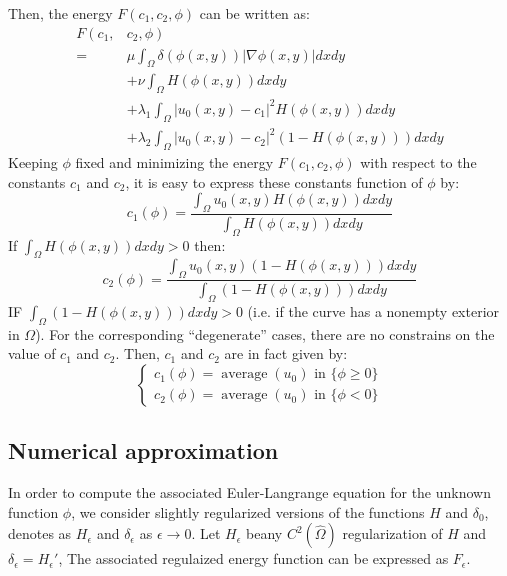 \documentclass[journal]{IEEEtran}
\begin{document}
Then, the energy $F(c_1,c_2,\phi)$ can be written as:
\begin{equation}
  \begin{aligned}
  F\left(c_{1},\right.&\left.c_{2}, \phi\right) \\
  =& \mu \int_{\Omega} \delta(\phi(x, y))|\nabla \phi(x, y)| d x d y \\
  &+\nu \int_{\Omega} H(\phi(x, y)) d x d y \\
  &+\lambda_{1} \int_{\Omega}\left|u_{0}(x, y)-c_{1}\right|^{2} H(\phi(x, y)) d x d y \\
  &+\lambda_{2} \int_{\Omega}\left|u_{0}(x, y)-c_{2}\right|^{2}(1-H(\phi(x, y))) d x d y
  \end{aligned}
\end{equation}
Keeping $\phi$ fixed and minimizing the energy $F(c_1,c_2,\phi)$ with respect to the constants $c_1$ and $c_2$, it is easy to express these constants function of $\phi$ by:
\begin{equation}
  c_{1}(\phi)=\frac{\int_{\Omega} u_{0}(x, y) H(\phi(x, y)) d x d y}{\int_{\Omega} H(\phi(x, y)) d x d y}
\end{equation} 
If $\int_\Omega H(\phi(x,y))d x d y >0$ then:
\begin{equation}
  c_{2}(\phi)=\frac{\int_{\Omega} u_{0}(x, y)(1-H(\phi(x, y))) d x d y}{\int_{\Omega}(1-H(\phi(x, y))) d x d y}
\end{equation}
IF $\int_\Omega(1-H(\phi(x,y)))d x d y>0$ (i.e. if the curve has a nonempty exterior in $\Omega$). For the corresponding ``degenerate'' cases, there are no constrains on the value of $c_1$ and $c_2$. Then, $c_1$ and $c_2$ are in fact given by:
\begin{equation}
  \left\{\begin{array}{l}
  c_{1}(\phi)=\operatorname{average}\left(u_{0}\right) \text { in }\{\phi \geq 0\} \\
  c_{2}(\phi)=\operatorname{average}\left(u_{0}\right) \text { in }\{\phi<0\}
  \end{array}\right.
\end{equation}

\subsection{Numerical approximation}
In order to compute the associated Euler-Langrange equation for the unknown function $\phi$, we consider slightly regularized versions of the functions $H$ and $\delta_0$, denotes as $H_\epsilon$ and $\delta_\epsilon$ as $\epsilon\to 0$. Let $H_\epsilon$ beany $C^2(\hat{\Omega})$ regularization of $H$ and $\delta_\epsilon=H_\epsilon'$, The associated regulaized energy function can be expressed as $F_\epsilon$.
\end{document}
